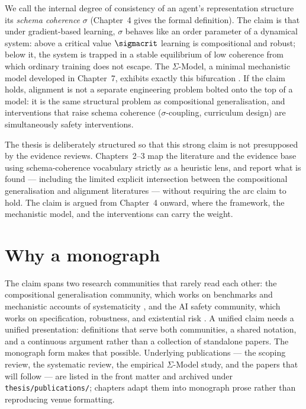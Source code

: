 We call the internal degree of consistency of an agent's representation structure its
\emph{schema coherence} $\sigma$ (Chapter~4 gives the formal definition). The claim is
that under gradient-based learning, $\sigma$ behaves like an order parameter of a
dynamical system: above a critical value $\sigmacrit$ learning is compositional and
robust; below it, the system is trapped in a stable equilibrium of low coherence from
which ordinary training does not escape. The $\Sigma$-Model, a minimal mechanistic
model developed in Chapter~7, exhibits exactly this bifurcation
\citep{amsyar2026sigma}. If the claim holds, alignment is not a separate engineering
problem bolted onto the top of a model: it is the same structural problem as
compositional generalisation, and interventions that raise schema coherence
($\sigma$-coupling, curriculum design) are simultaneously safety interventions.

The thesis is deliberately structured so that this strong claim is not presupposed by
the evidence reviews. Chapters~2--3 map the literature and the evidence base using
schema-coherence vocabulary strictly as a heuristic lens, and report what is found
--- including the limited explicit intersection between the compositional
generalisation and alignment literatures --- without requiring the arc claim to hold.
The claim is argued from Chapter~4 onward, where the framework, the mechanistic
model, and the interventions can carry the weight.

\section{Why a monograph}

The claim spans two research communities that rarely read each other: the
compositional generalisation community, which works on benchmarks and mechanistic
accounts of systematicity \citep{keysers2020measuring,hupkes2023taxonomy,
lake2023compositional}, and the AI safety community, which works on specification,
robustness, and existential risk \citep{bostrom2014superintelligence,
hendrycks2023overview,ji2023survey}. A unified claim needs a unified presentation:
definitions that serve both communities, a shared notation, and a continuous argument
rather than a collection of standalone papers. The monograph form makes that possible.
Underlying publications --- the scoping review, the systematic review, the empirical
$\Sigma$-Model study, and the papers that will follow --- are listed in the front
matter and archived under \texttt{thesis/publications/}; chapters adapt them into
monograph prose rather than reproducing venue formatting.

